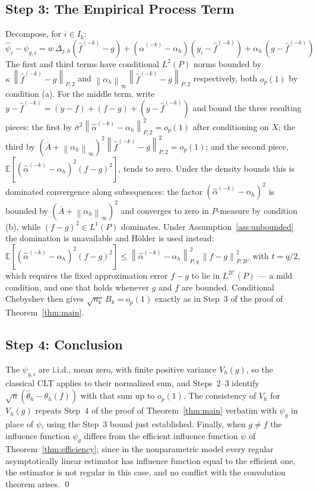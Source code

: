 \documentclass[12pt]{article}
\newcommand{\norm}[1]{\left\| #1 \right\|}
\newcommand{\E}{\mathbb{E}}
\newcommand{\Dh}{\Delta_{j,h}}
\newcommand{\Ptwo}[1]{\norm{#1}_{P,2}}
\newcommand{\Pq}[2]{\norm{#1}_{P,#2}}
\begin{document}
	\subsection{Step 3: The Empirical Process Term}
	
	Decompose, for $i \in I_k$:
	\begin{equation}
		\hat{\psi}_i - \psi_{g,i}
		= w\, \Dh(\hat{f}^{(-k)} - g)
		+ (\hat{\alpha}^{(-k)} - \alpha_h)(y_i - \hat{f}^{(-k)})
		+ \alpha_h\,(g - \hat{f}^{(-k)})
	\end{equation}
	The first and third terms have conditional $L^2(P)$ norms bounded by
	$\kappa\, \Ptwo{\hat{f}^{(-k)} - g}$ and
	$\norm{\alpha_h}_\infty \Ptwo{\hat{f}^{(-k)} - g}$ respectively, both $o_p(1)$
	by condition (a). For the middle term, write
	$y - \hat{f}^{(-k)} = (y - f) + (f - g) + (g - \hat{f}^{(-k)})$ and bound the
	three resulting pieces: the first by
	$\bar{\sigma}^2 \Ptwo{\hat{\alpha}^{(-k)} - \alpha_h}^2 = o_p(1)$ after
	conditioning on $X$; the third by
	$(\bar{A} + \norm{\alpha_h}_\infty)^2 \Ptwo{\hat{f}^{(-k)} - g}^2 = o_p(1)$; and
	the second piece, $\E[(\hat{\alpha}^{(-k)} - \alpha_h)^2 (f - g)^2]$, tends to
	zero. Under the density bounds this is dominated convergence along subsequences:
	the factor $(\hat{\alpha}^{(-k)} - \alpha_h)^2$ is bounded by
	$(\bar{A} + \norm{\alpha_h}_\infty)^2$ and converges to zero in $P$-measure by
	condition (b), while $(f - g)^2 \in L^1(P)$ dominates. Under
	Assumption~\ref{ass:unbounded} the domination is unavailable and H\"{o}lder is
	used instead:
	$\E[(\hat{\alpha}^{(-k)} - \alpha_h)^2 (f - g)^2]
	\leq \Pq{\hat{\alpha}^{(-k)} - \alpha_h}{q}^2\, \Pq{f - g}{2t'}^2$ with
	$t = q/2$, which requires the fixed approximation error $f - g$ to lie in
	$L^{2t'}(P)$ --- a mild condition, and one that holds whenever $g$ and $f$ are
	bounded. Conditional Chebyshev then
	gives $\sqrt{n_k}\, B_k = o_p(1)$ exactly as in Step~3 of the proof of
	Theorem~\ref{thm:main}.
	
	\subsection{Step 4: Conclusion}
	
	The $\psi_{g,i}$ are i.i.d., mean zero, with finite positive variance $V_h(g)$,
	so the classical CLT applies to their normalized sum, and Steps~2--3 identify
	$\sqrt{n}(\hat{\theta}_h - \theta_h(f))$ with that sum up to $o_p(1)$. The
	consistency of $\hat{V}_h$ for $V_h(g)$ repeats Step~4 of the proof of
	Theorem~\ref{thm:main} verbatim with $\psi_{g}$ in place of $\psi$, using the
	Step~3 bound just established. Finally, when $g \neq f$ the influence function
	$\psi_g$ differs from the efficient influence function $\psi$ of
	Theorem~\ref{thm:efficiency}; since in the nonparametric model every regular
	asymptotically linear estimator has influence function equal to the efficient
	one, the estimator is not regular in this case, and no conflict with the
	convolution theorem arises.
	\qed
	
\end{document}

